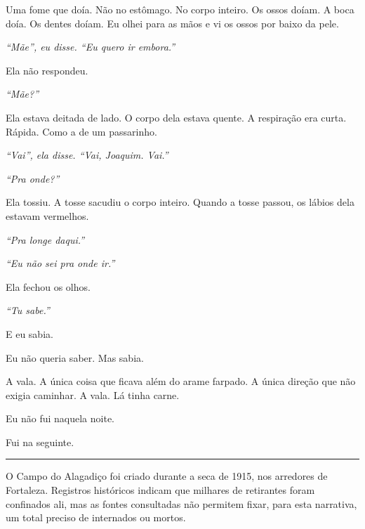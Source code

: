 \noindent Uma fome que doía. Não no estômago. No corpo inteiro. Os ossos doíam. A boca doía. Os dentes doíam. Eu olhei para as mãos e vi os ossos por baixo da pele.

\noindent \textit{\textquotedblleft{}Mãe\textquotedblright{}\textit{, eu disse. }\textquotedblleft{}Eu quero ir embora.\textquotedblright{}}

\noindent Ela não respondeu.

\noindent \textit{\textquotedblleft{}Mãe?\textquotedblright{}}

\noindent Ela estava deitada de lado. O corpo dela estava quente. A respiração era curta. Rápida. Como a de um passarinho.

\noindent \textit{\textquotedblleft{}Vai\textquotedblright{}\textit{, ela disse. }\textquotedblleft{}Vai, Joaquim. Vai.\textquotedblright{}}

\noindent \textit{\textquotedblleft{}Pra onde?\textquotedblright{}}

\noindent Ela tossiu. A tosse sacudiu o corpo inteiro. Quando a tosse passou, os lábios dela estavam vermelhos.

\noindent \textit{\textquotedblleft{}Pra longe daqui.\textquotedblright{}}

\noindent \textit{\textquotedblleft{}Eu não sei pra onde ir.\textquotedblright{}}

\noindent Ela fechou os olhos.

\noindent \textit{\textquotedblleft{}Tu sabe.\textquotedblright{}}

\noindent E eu sabia.

\noindent Eu não queria saber. Mas sabia.

\noindent A vala. A única coisa que ficava além do arame farpado. A única direção que não exigia caminhar. A vala. Lá tinha carne.

\noindent Eu não fui naquela noite.

\noindent Fui na seguinte.

\vspace{0.5em}\noindent\rule{\textwidth}{0.5pt}\vspace{0.5em}

\noindent O Campo do Alagadiço foi criado durante a seca de 1915, nos arredores de Fortaleza. Registros históricos indicam que milhares de retirantes foram confinados ali, mas as fontes consultadas não permitem fixar, para esta narrativa, um total preciso de internados ou mortos.


